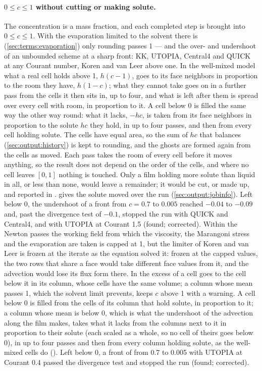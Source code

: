 \paragraph{$0 \le c \le 1$ without cutting or making solute.} The
concentration is a mass fraction, and each completed step is brought into
$0 \le c \le 1$. With the evaporation limited to the solvent there is
(\cref{sec:terms:evaporation}) only rounding passes 1 --- and the over- and
undershoot of an unbounded scheme at a sharp front: KK, UTOPIA, Central4 and
QUICK at any Courant number, Koren and van Leer above one. In the well-mixed
model what a real cell holds above 1, $h(c-1)$, goes to its face neighbors in
proportion to the room they have, $h(1-c)$; what they cannot take goes on in
a further pass from the cells it then sits in, up to four, and what is left
after them is spread over every cell with room, in proportion to it. A cell
below 0 is filled the same way the other way round: what it lacks, $-hc$, is
taken from its face neighbors in proportion to the solute $hc$ they hold, in
up to four passes, and then from every cell holding solute. The cells have
equal area, so the sum of $hc$ that  balances
(\cref{sec:output:history}) is kept to rounding, and the ghosts are formed
again from the cells as moved. Each pass takes the room of every cell before
it moves anything, so the result does not depend on the order of the cells,
and where no cell leaves $[0, 1]$ nothing is touched. Only a film holding more
solute than liquid in all, or less than none, would leave a remainder; it
would be cut, or made up, and reported in .
 gives the solute moved over the run
(\cref{sec:output:jobinfo}). Left below 0, the undershoot of a front from
$c = 0.7$ to $0.005$ reached $-0.04$ to $-0.09$ and, past the divergence test
of $-0.1$, stopped the run with QUICK and Central4, and with UTOPIA at
Courant 1.5 (found; corrected). Within the Newton passes the working field from
which the viscosity, the Marangoni stress and the evaporation are taken is
capped at 1, but the limiter of Koren and van Leer is frozen at the iterate as
the equation solved it: frozen at the capped values, the two rows that share a
face would take different face values from it, and the advection would lose
its flux form there. In  the excess of a cell goes to the cell
below it in its column, whose cells have the same volume; a column whose mean
passes 1, which the solvent limit prevents, keeps $c$ above 1 with a warning.
A cell below 0 is filled from the cells of its column that hold solute, in
proportion to it; a column whose mean is below 0, which is what the
undershoot of the advection along the film makes, takes what it lacks from
the columns next to it in proportion to their solute (each scaled as a whole,
so no cell of theirs goes below 0), in up to four passes and then from every
column holding solute, as the well-mixed cells do
(). Left below 0, a front
of  from 0.7 to 0.005 with UTOPIA at Courant 0.4 passed the
divergence test and stopped the run (found; corrected).

